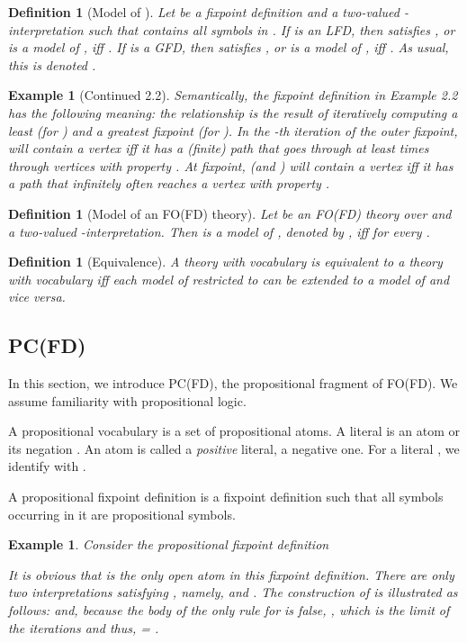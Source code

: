 \documentclass{tlp}
\newtheorem{example}[lemma]{Example}
\newtheorem{definition}[lemma]{Definition}
\begin{document}
\begin{definition}[Model of ]
Let  be a fixpoint definition and  a two-valued -interpretation such
that  contains all symbols in . If  is an LFD, then  {\em satisfies} , or  is a {\em model} of , iff . If  is a GFD, then  {\em satisfies} , or  is a {\em model} of , iff . As usual, this is denoted .
\end{definition}

\begin{example}[Continued 2.2]
Semantically, the fixpoint definition in Example 2.2 has the following meaning: the relationship  is the result of iteratively computing a least (for ) and a greatest fixpoint (for ). In the -th iteration of the outer fixpoint,  will contain a vertex iff it has a (finite) path that goes through at least  times through vertices with property . At fixpoint,  (and ) will contain a vertex iff it has a path that infinitely often reaches a vertex with property .
\end{example}

\begin{definition}[Model of an FO(FD) theory] \label{def:modelfofdtheory}
Let  be an FO(FD) theory over  and  a two-valued -interpretation. Then  is a {\em model} of , denoted by , iff  for every .
\end{definition}

\begin{definition}[Equivalence]
A theory  with vocabulary  is equivalent to a theory  with vocabulary  iff each model  of  restricted to  can be extended to a model  of  and vice versa.
\end{definition}

\subsection{PC(FD)}
In this section, we introduce PC(FD), the propositional fragment of FO(FD). We assume familiarity with propositional logic.

A propositional vocabulary  is a set of propositional atoms. A literal is an atom  or its negation . An atom  is called
a {\em positive} literal,  a negative one. For a literal , we identify  with .



A propositional fixpoint definition is a fixpoint definition such that all symbols occurring in it are propositional symbols.

\begin{example} \label{ex:propositionalfixpoint}
Consider the propositional fixpoint definition

It is obvious that  is the only open atom in this fixpoint definition. There are only two interpretations satisfying , namely,  and . The construction of  is illustrated as follows:  and, because the body of the only rule for  is false, , which is the limit of the iterations and thus,  = .
\end{example}
\end{document}
